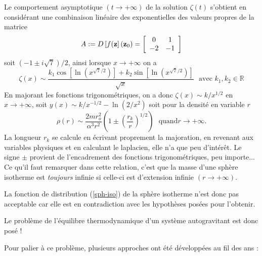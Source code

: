 Le comportement asymptotique $\left(  t\rightarrow+\infty\right)  $ de la
solution $\zeta(t)$ s'obtient en consid\'{e}rant une combinaison lin\'{e}aire
des exponentielles des valeurs propres de la matrice
$$
A:=D\left[f(\mathbf{z}\right](\mathbf{z}_0)=\left[
\begin{array}
[c]{cc}%
0     & 1\\
-2 & -1\\
\end{array}
\right]
$$ soit $\left(  -1\pm i\sqrt
{7}\right)  /2$, ainsi lorsque $x\rightarrow+\infty$ on a
\[
\zeta\left(  x\right)
\sim\frac{k_{1}\cos\left[  \ln\left(  x^{\sqrt{7}/2}\right)  \right]
+k_{2}\sin\left[  \ln\left(  x^{\sqrt{7}/2}\right)  \right]  }{\sqrt{x}%
}\ \ \ \text{avec }k_{1},k_{2}\in\mathbb{R}%
\]
En majorant les fonctions trigonom\'{e}triques, on a donc $\zeta\left(
x\right)  \sim k/x^{1/2}$ en $x\rightarrow+\infty$, soit $y\left(  x\right)
\sim k/x^{-1/2}-\ln\left(  2/x^{2}\right)  $ soit pour la densit\'{e} en
variable $r$%
\begin{equation}
\rho\left(  r\right)  \sim\frac{2mr_{o}^{2}}{\alpha^{3}r^{2}}\left(
1\pm\left(  \frac{r_{k}}{r}\right)  ^{1/2}\right)  \ \ \ \text{quand
}r\rightarrow+\infty\text{.}\label{asymp_sph_iso}%
\end{equation}
La longueur $r_{k}$ se calcule en \'{e}crivant proprement la majoration, en
revenant aux variables physiques et en calculant le laplacien, elle n'a que
peu d'int\'{e}r\^{e}t. Le signe $\pm$ provient de l'encadrement des fonctions
trigonom\'{e}triques, peu importe... Ce qu'il faut remarquer dans cette
relation, c'est que la masse d'une sph\`{e}re isotherme est \emph{toujours} infinie si
celle-ci est d'extension infinie $\left(  r\rightarrow+\infty\right)$.

La fonction de distribution (\ref{sph-iso}) de la sph\`{e}re isotherme n'est donc pas acceptable car elle est en contradiction avec les hypothèses posées pour l'obtenir.

 Le probl\`{e}me de l'\'{e}quilibre thermodynamique d'un syst\`{e}me autogravitant est donc pos\'{e} !

	Pour palier à ce problème, plusieurs approches ont été développées au fil des ans :
	

